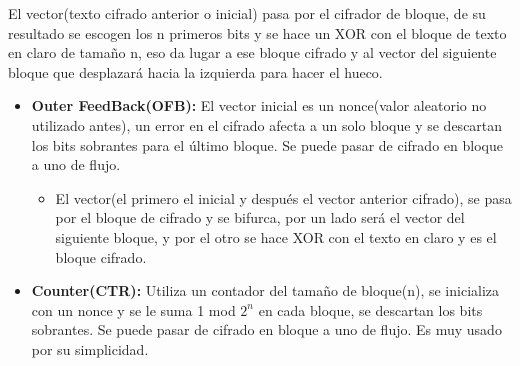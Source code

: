 \documentclass[12pt, twoside, openright]{report} %
\begin{document}
  El vector(texto cifrado anterior o inicial) pasa por el cifrador de
  bloque, de su resultado se escogen los n primeros bits y se hace un
  XOR con el bloque de texto en claro de tamaño n, eso da lugar a ese
  bloque cifrado y al vector del siguiente bloque que desplazará hacia
  la izquierda para hacer el hueco.

  \begin{itemize}
  \item \textbf{Outer FeedBack(OFB):} El vector inicial es un nonce(valor
    aleatorio no utilizado antes), un error en el cifrado afecta a un
    solo bloque y se descartan los bits sobrantes para el último bloque.
    Se puede pasar de cifrado en bloque a uno de flujo.
    

    \begin{itemize}
    \item El vector(el primero el inicial y después el vector anterior
      cifrado), se pasa por el bloque de cifrado y se bifurca, por un
      lado será el vector del siguiente bloque, y por el otro se hace
      XOR con el texto en claro y es el bloque cifrado.
      
    \end{itemize}
  \item \textbf{Counter(CTR):} Utiliza un contador del tamaño de bloque(n),
    se inicializa con un nonce y se le suma 1 mod $2^n$ en cada bloque,
    se descartan los bits sobrantes. Se puede pasar de cifrado en bloque
    a uno de flujo. Es muy usado por su simplicidad.
    
  \end{itemize}
\end{document}

